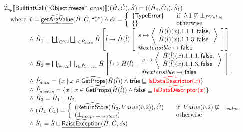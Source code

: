 \documentclass{article}
\makeatletter
\newcommand{\SF}[1]{\mbox{\textsf{#1}}}
\newcommand{\wherec}[1]{{\rm where}\begin{array}[t]{l}#1\end{array}}
\newcommand{\ifc}[1]{{\rm if}\begin{array}[t]{l}#1\end{array}}
\newcommand{\owc}{{\rm otherwise}}
\newcommand{\aI}{\hat{\mathcal{I}}}
\newcommand{\lbr}{\llbracket}
\newcommand{\rbr}{\rrbracket}
\newcommand{\ahf}[1]{\widehat{\underline{\sf #1}}}
\newcommand{\avarprop}[1]{\hat{@#1}}
\newcommand{\atrue}{\hat{\SF{true}}}
\newcommand{\afalse}{\hat{\SF{false}}}
\def\inred{\color{red}}
\def\inred{\color{red}}
\makeatother
\begin{document}
\[\begin{array}{ll}
\aI _{cp}\lbr \SF{BuiltintCall}(``\SF{Object.freeze}",args)\rbr((\hat{H},\hat{C}), \hat{S})
  = ((\hat{H}_4, \hat{C}_4), \hat{S}_1)\\
\quad\wherec{
 \hat{v} =\ahf{getArgValue}(\hat{H}, \hat{C}, ``0")
  \land \hat{es} =
    \left\{
    \begin{array}{l@{\quad\quad}l}
      \{ \SF{TypeError} \} & \ifc{\hat{v}.1 \not\sqsubseteq \bot_{PValue}}\\
      \{ \}& \owc\\
    \end{array}
    \right.\\
  \land\ \hat{H}_1 = \bigsqcup_{\hat{l} \in \hat{v}.2}
    \bigsqcup_{s \in \hat{P}_{data}} \hat{H}  
    \left[\hat{l} \mapsto \hat{H}(\hat{l})
      \left[\begin{array}{l}
        s \mapsto 
        \left\langle\begin{array}{l}
          \hat{H}(\hat{l})(x).1.1.1, \afalse,\\
          \hat{H}(\hat{l})(x).1.1.3, \afalse 
        \end{array}\right\rangle\\
      \avarprop{extensible} \mapsto \afalse
      \end{array}\right]\right]\\
  \land\ \hat{H}_2 = \bigsqcup_{\hat{l} \in \hat{v}.2}
    \bigsqcup_{s \in \hat{P}_{access}} \hat{H}  
    \left[\hat{l} \mapsto \hat{H}(\hat{l})
      \left[\begin{array}{l}
        s \mapsto 
        \left\langle\begin{array}{l}
          \hat{H}(\hat{l})(x).1.1.1, \afalse,\\
          \hat{H}(\hat{l})(x).1.1.3, \afalse 
        \end{array}\right\rangle\\
      \avarprop{extensible} \mapsto \afalse
      \end{array}\right]\right]\\
  \land\ \hat{P}_{data} =
    \{ x \mid x \in \ahf{GetProps}(\hat{H}(\hat{l})) \land \atrue \sqsubseteq {\inred \ahf{IsDataDescriptor}(x)}\}\\
  \land\ \hat{P}_{access} =
    \{ x \mid x \in \ahf{GetProps}(\hat{H}(\hat{l})) \land \afalse \sqsubseteq {\inred \ahf{IsDataDescriptor}(x)}\}\\  
  \land\ \hat{H}_3 = \hat{H}_1 \sqcup \hat{H}_2\\
  \land\ (\hat{H}_4, \hat{C}_4) = 
    \left\{\begin{array}{l@{\quad\quad}l}
      (\ahf{ReturnStore}(\hat{H}_3, Value(\hat{v}.2)), \hat{C})
      & \ifc{Value(\hat{v}.2) \not\sqsubseteq \bot_{value}}\\
      (\bot_{heap}, \bot_{context}) & \owc \\
    \end{array}\right.\\
  \land\ \hat{S}_1 = \hat{S} \sqcup \ahf{RaiseException}(\hat{H}, \hat{C}, \hat{es})\\
  }\\
\\\\ 




\end{array}\]
\end{document}
